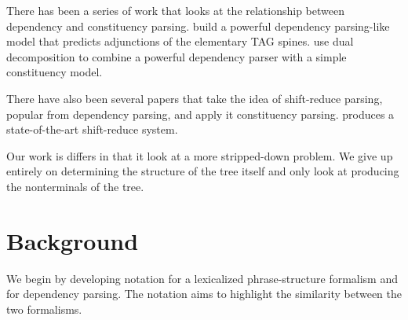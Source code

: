 \documentclass[11pt,letterpaper]{article}
\begin{document}








There has been a series of work that looks at the relationship
between dependency and constituency parsing. \cite{carreras2008tag}
build a powerful dependency parsing-like model that predicts
adjunctions of the elementary TAG spines. \cite{rush2010dual} use
dual decomposition to combine a powerful dependency parser with
a simple constituency model.

There have also been several papers that take the idea of
shift-reduce parsing, popular from dependency parsing, and apply
 it constituency parsing. \cite{zhu2013fast} produces a state-of-the-art shift-reduce
system.

Our work is differs in that it look at a more stripped-down problem.
We give up entirely on determining the structure of the tree itself and only
look at  producing the nonterminals of the tree.







\section{Background}

We begin by developing notation for a lexicalized phrase-structure formalism and for dependency parsing. The notation aims to highlight the similarity between the two formalisms.
\end{document}
